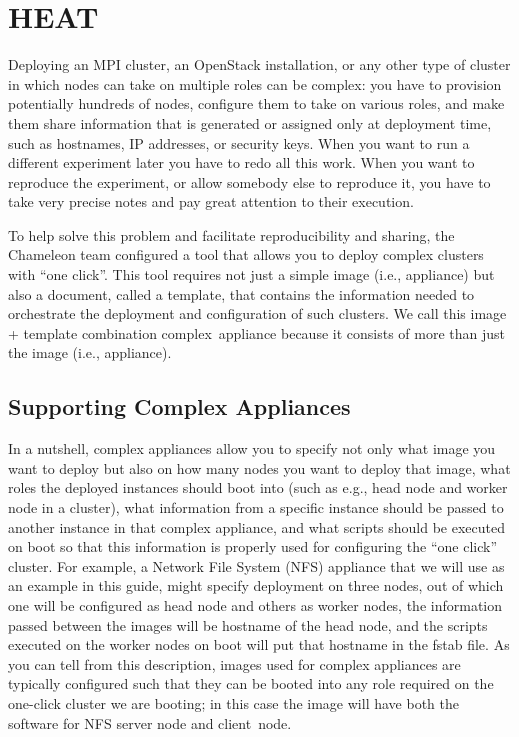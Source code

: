\section{HEAT}

\label{C:cc-heat}

\FILENAME

Deploying an MPI cluster, an OpenStack installation, or any other type
of cluster in which nodes can take on multiple roles can be complex: you
have to provision potentially hundreds of nodes, configure them to take
on various roles, and make them share information that is generated or
assigned only at deployment time, such as hostnames, IP addresses, or
security keys. When you want to run a different experiment later you
have to redo all this work. When you want to reproduce the experiment,
or allow somebody else to reproduce it, you have to take very precise
notes and pay great attention to their execution.

To help solve this problem and facilitate reproducibility and sharing,
the Chameleon team configured a tool that allows you to deploy complex
clusters with ``one click''. This tool requires not just a simple image
(i.e., appliance) but also a document, called a template, that contains
the information needed to orchestrate the deployment and configuration
of such clusters. We call this image + template combination
complex~appliance because it consists of more than just the image (i.e.,
appliance).

\subsection{Supporting Complex Appliances}

In a nutshell, complex appliances allow you to specify not only what
image you want to deploy but also on how many nodes you want to deploy
that image, what roles the deployed instances should boot into (such as
e.g., head node and worker node in a cluster), what information from a
specific instance should be passed to another instance in that complex
appliance, and what scripts should be executed on boot so that this
information is properly used for configuring the ``one click'' cluster.
For example, a Network File System (NFS) appliance that we will use as
an example in this guide, might specify deployment on three nodes, out
of which one will be configured as head node and others as worker nodes,
the information passed between the images will be hostname of the head
node, and the scripts executed on the worker nodes on boot will put that
hostname in the fstab file. As you can tell from this description,
images used for complex appliances are typically configured such that
they can be booted into any role required on the one-click cluster we
are booting; in this case the image will have both the software for NFS
server node and client~node.

